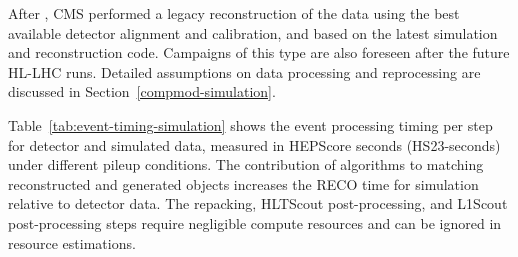 After \RunTwo, CMS performed a legacy reconstruction of the \RunTwo data using the best available detector alignment and calibration, and based on the latest simulation and reconstruction code. Campaigns of this type are also foreseen after the future \gls{HL-LHC} runs. Detailed assumptions on data processing and reprocessing are discussed in Section~\ref{compmod-simulation}.

Table~\ref{tab:event-timing-simulation} shows the event processing timing per step for detector and simulated data, measured in HEPScore seconds 
(HS23-seconds)~\cite{Giordano:2023vnv} under different pileup conditions. The contribution of algorithms to matching reconstructed and generated objects increases the \gls{RECO} time for simulation relative to detector data. The repacking, HLTScout post-processing, and L1Scout post-processing steps require negligible compute resources and can be ignored in resource estimations.


